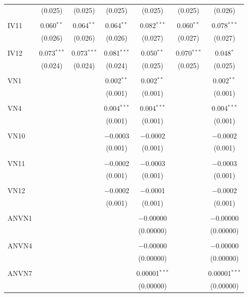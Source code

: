 \begin{table}[!htbp]
\begin{tabular}{@{\extracolsep{5pt}}lcccccc}
  & (0.025) & (0.025) & (0.025) & (0.025) & (0.025) & (0.026) \\ 
  & & & & & & \\ 
 IV11 & 0.060$^{**}$ & 0.064$^{**}$ & 0.064$^{**}$ & 0.082$^{***}$ & 0.060$^{**}$ & 0.078$^{***}$ \\ 
  & (0.026) & (0.026) & (0.026) & (0.027) & (0.027) & (0.027) \\ 
  & & & & & & \\ 
 IV12 & 0.073$^{***}$ & 0.073$^{***}$ & 0.081$^{***}$ & 0.050$^{**}$ & 0.070$^{***}$ & 0.048$^{*}$ \\ 
  & (0.024) & (0.024) & (0.024) & (0.025) & (0.025) & (0.025) \\ 
  & & & & & & \\ 
 VN1 &  &  & 0.002$^{**}$ & 0.002$^{**}$ &  & 0.002$^{**}$ \\ 
  &  &  & (0.001) & (0.001) &  & (0.001) \\ 
  & & & & & & \\ 
 VN4 &  &  & 0.004$^{***}$ & 0.004$^{***}$ &  & 0.004$^{***}$ \\ 
  &  &  & (0.001) & (0.001) &  & (0.001) \\ 
  & & & & & & \\ 
 VN10 &  &  & $-$0.0003 & $-$0.0002 &  & $-$0.0002 \\ 
  &  &  & (0.001) & (0.001) &  & (0.001) \\ 
  & & & & & & \\ 
 VN11 &  &  & $-$0.0002 & $-$0.0003 &  & $-$0.0003 \\ 
  &  &  & (0.001) & (0.001) &  & (0.001) \\ 
  & & & & & & \\ 
 VN12 &  &  & $-$0.0002 & $-$0.0001 &  & $-$0.0002 \\ 
  &  &  & (0.001) & (0.001) &  & (0.001) \\ 
  & & & & & & \\ 
 ANVN1 &  &  &  & $-$0.00000 &  & $-$0.00000 \\ 
  &  &  &  & (0.00000) &  & (0.00000) \\ 
  & & & & & & \\ 
 ANVN4 &  &  &  & $-$0.00000 &  & $-$0.00000 \\ 
  &  &  &  & (0.00000) &  & (0.00000) \\ 
  & & & & & & \\ 
 ANVN7 &  &  &  & 0.00001$^{***}$ &  & 0.00001$^{***}$ \\ 
  &  &  &  & (0.00000) &  & (0.00000) \\ 

\end{tabular}
\end{table}
